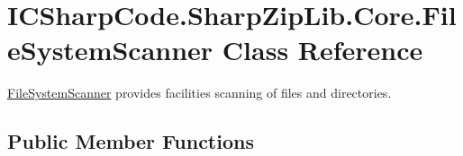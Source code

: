 \hypertarget{class_i_c_sharp_code_1_1_sharp_zip_lib_1_1_core_1_1_file_system_scanner}{}\section{I\+C\+Sharp\+Code.\+Sharp\+Zip\+Lib.\+Core.\+File\+System\+Scanner Class Reference}
\label{class_i_c_sharp_code_1_1_sharp_zip_lib_1_1_core_1_1_file_system_scanner}


\hyperlink{class_i_c_sharp_code_1_1_sharp_zip_lib_1_1_core_1_1_file_system_scanner}{File\+System\+Scanner} provides facilities scanning of files and directories.  


\subsection*{Public Member Functions}
